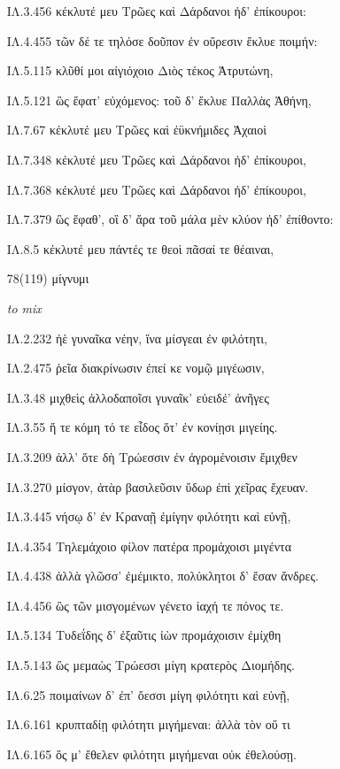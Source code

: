 \begin{enumerate}
{ΙΛ.3.456 κέκλυτέ μευ Τρῶες καὶ Δάρδανοι ἠδ' ἐπίκουροι: 

ΙΛ.4.455 τῶν δέ τε τηλόσε δοῦπον ἐν οὔρεσιν ἔκλυε ποιμήν: 

ΙΛ.5.115 κλῦθί μοι αἰγιόχοιο Διὸς τέκος Ἀτρυτώνη, 

ΙΛ.5.121 ὣς ἔφατ' εὐχόμενος: τοῦ δ' ἔκλυε Παλλὰς Ἀθήνη, 

ΙΛ.7.67 κέκλυτέ μευ Τρῶες καὶ ἐϋκνήμιδες Ἀχαιοὶ 

ΙΛ.7.348 κέκλυτέ μευ Τρῶες καὶ Δάρδανοι ἠδ' ἐπίκουροι, 

ΙΛ.7.368 κέκλυτέ μευ Τρῶες καὶ Δάρδανοι ἠδ' ἐπίκουροι, 

ΙΛ.7.379 ὣς ἔφαθ', οἳ δ' ἄρα τοῦ μάλα μὲν κλύον ἠδ' ἐπίθοντο: 

ΙΛ.8.5 κέκλυτέ μευ πάντές τε θεοὶ πᾶσαί τε θέαιναι, 

}

\clearpage
\item[\large 78(119)]{\large \g μίγνυμι}

\hspace{0.2cm} \textit{ to mix  }

{\g
ΙΛ.2.232 ἠὲ γυναῖκα νέην, ἵνα μίσγεαι ἐν φιλότητι, 

ΙΛ.2.475 ῥεῖα διακρίνωσιν ἐπεί κε νομῷ μιγέωσιν, 

ΙΛ.3.48 μιχθεὶς ἀλλοδαποῖσι γυναῖκ' εὐειδέ' ἀνῆγες 

ΙΛ.3.55 ἥ τε κόμη τό τε εἶδος ὅτ' ἐν κονίῃσι μιγείης. 

ΙΛ.3.209 ἀλλ' ὅτε δὴ Τρώεσσιν ἐν ἀγρομένοισιν ἔμιχθεν 

ΙΛ.3.270 μίσγον, ἀτὰρ βασιλεῦσιν ὕδωρ ἐπὶ χεῖρας ἔχευαν. 

ΙΛ.3.445 νήσῳ δ' ἐν Κραναῇ ἐμίγην φιλότητι καὶ εὐνῇ, 

ΙΛ.4.354 Τηλεμάχοιο φίλον πατέρα προμάχοισι μιγέντα 

ΙΛ.4.438 ἀλλὰ γλῶσσ' ἐμέμικτο, πολύκλητοι δ' ἔσαν ἄνδρες. 

ΙΛ.4.456 ὣς τῶν μισγομένων γένετο ἰαχή τε πόνος τε. 

ΙΛ.5.134 Τυδεΐδης δ' ἐξαῦτις ἰὼν προμάχοισιν ἐμίχθη 

ΙΛ.5.143 ὣς μεμαὼς Τρώεσσι μίγη κρατερὸς Διομήδης. 

ΙΛ.6.25 ποιμαίνων δ' ἐπ' ὄεσσι μίγη φιλότητι καὶ εὐνῇ, 

ΙΛ.6.161 κρυπταδίῃ φιλότητι μιγήμεναι: ἀλλὰ τὸν οὔ τι 

ΙΛ.6.165 ὅς μ' ἔθελεν φιλότητι μιγήμεναι οὐκ ἐθελούσῃ. 

}
\end{enumerate}
